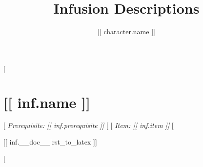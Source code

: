 \documentclass[10pt,twocolumn,lettersize]{article}
\title{Infusion Descriptions}
\author{[[ character.name ]]}
\date{}
\begin{document}
\maketitle

[%

  \section*{[[ inf.name ]]}

  [%
    \textit{Prerequisite: [[ inf.prerequisite ]]}%
  [%
  [%
  	\textit{Item: [[ inf.item ]]}%
  [%


  [[ inf.__doc__|rst_to_latex ]]

[%
\end{document}
